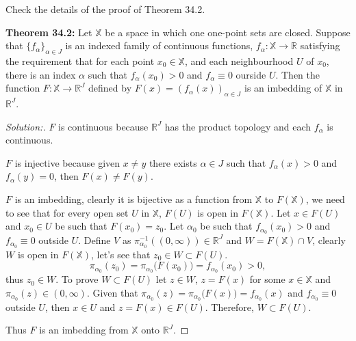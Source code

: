 \documentclass[a4paper,12pt, reqno]{article}
\theoremstyle{definition}
\newenvironment{exerr}[1]{
  \renewcommand\theexeralt{#1}
  \exeralt
}{\endexeralt}
\newenvironment{solution}{\begin{proof}[Solution:]}{\end{proof}}
\newcommand{\R}{\mathbb{R}}
\newcommand{\X}{\mathbb{X}}
\begin{document}
\begin{exerr}{6}
  Check the details of the proof of Theorem 34.2.

  \textbf{Theorem 34.2:} Let $\X$ be a space in which one one-point sets are closed. Suppose that $\{ f_{\alpha} \}_{\alpha\in J}$ is an indexed family of continuous functions, $f_{\alpha}:\X\to\R$ satisfying the requirement that for each point $x_{0}\in\X$, and each neighbourhood $U$ of $x_{0}$, there is an index $\alpha$ such that $f_{\alpha}(x_{0})>0$ and $f_{\alpha}\equiv 0$ ourside $U$. Then the function $F:\X\to\R^J$ defined by $F(x) = (f_{\alpha}(x))_{\alpha\in J}$ is an imbedding of $\X$ in $\R^J$.
\end{exerr}
\begin{solution}
  $F$ is continuous because $\R^J$ has the product topology and each $f_{\alpha}$ is continuous.

  $F$ is injective because given $x\neq y$ there exists $\alpha\in J$ such that $f_{\alpha}(x)>0$ and $f_{\alpha}(y)=0$, then $F(x)\neq F(y)$.

  $F$ is an imbedding, clearly it is bijective as a function from $\X$ to $F(\X)$, we need to see that for every open set $U$ in $\X$, $F(U)$ is open in $F(\X)$. Let $x\in F(U)$ and $x_{0}\in U$ be such that $F(x_{0}) = z_{0}$. Let $\alpha_{0}$ be such that $f_{\alpha_{0}}(x_{0})>0$ and $f_{\alpha_{0}}\equiv 0$ outside $U$. Define $V$ as $\pi^{-1}_{\alpha_{0}}((0,\infty))\in \R^J$ and $W = F(\X)\cap V$, clearly $W$ is open in $F(\X)$, let's see that $z_{0}\in W\subset F(U)$.
  \begin{equation*}
      \pi_{\alpha_{0}}(z_{0}) = \pi_{\alpha_{0}}\big( F(x_{0}) \big) = f_{\alpha_{0}}(x_{0})>0,
  \end{equation*}
  thus $z_{0}\in W$. To prove $W\subset F(U)$ let $z\in W$, $z = F(x)$ for some $x\in \X$ and $\pi_{\alpha_{0}}(z) \in (0,\infty)$. Given that $\pi_{\alpha_{0}}(z) = \pi_{\alpha_{0}}\big( F(x) \big) = f_{\alpha_{0}}(x)$ and $f_{\alpha_{0}}\equiv 0$ outside $U$, then $x\in U$ and $z = F(x)\in F(U)$. Therefore, $W\subset F(U)$.

  Thus $F$ is an imbedding from $\X$ onto $\R^J$.
\end{solution}
\end{document}
